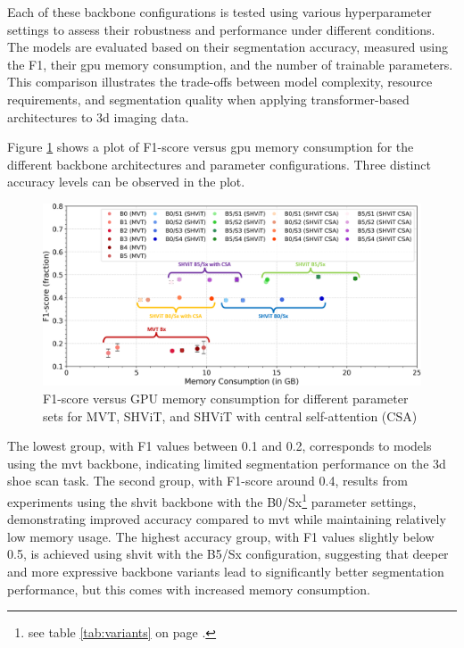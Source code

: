 \medskip

Each of these backbone configurations is tested using various hyperparameter settings to assess their robustness and performance under different conditions. The models are evaluated based on their segmentation accuracy, measured using the F1, their \acrshort{gpu} memory consumption, and the number of trainable parameters. This comparison illustrates the trade-offs between model complexity, resource requirements, and segmentation quality when applying transformer-based architectures to \gls{3d} imaging data.

\bigskip

Figure \ref{iou_vs_gpu_memory} shows a plot of F1-score versus \acrshort{gpu} memory consumption for the different backbone architectures and parameter configurations. Three distinct accuracy levels can be observed in the plot. 
\begin{figure}[H]
	\centering
	\includegraphics[width=1.0\textwidth]{./images/F1_vs_gpu_memory_w_text.png}
	\caption[F1-score versus GPU memory consumption]{F1-score versus GPU memory consumption for different parameter sets for MVT, SHViT, and SHViT with central self-attention (CSA)}
	\label{iou_vs_gpu_memory}
\end{figure}
The lowest group, with F1 values between 0.1 and  0.2, corresponds to models using the \gls{mvt} backbone, indicating limited segmentation performance on the \gls{3d} shoe scan task. The second group, with F1-score around 0.4, results from experiments using the \gls{shvit} backbone with the B0/Sx\footnote{see table \ref{tab:variants} on page \pageref{tab:variants}.} parameter settings, demonstrating improved accuracy compared to \gls{mvt} while maintaining relatively low memory usage. The highest accuracy group, with F1 values slightly below 0.5, is achieved using \gls{shvit} with the B5/Sx configuration, suggesting that deeper and more expressive backbone variants lead to significantly better segmentation performance, but this comes with increased memory consumption.

